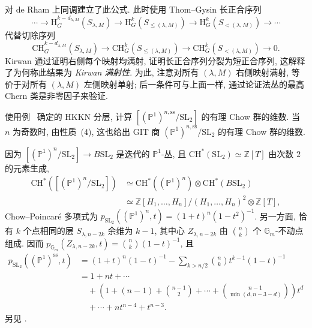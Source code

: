 \begin{remark}\label{src:8.7.15}
\cite[定理 5.4]{Kir84} 对 de Rham 上同调建立了此公式. 此时使用 Thom--Gysin 长正合序列
\[
\cdots\to\mathrm H_G^{k-d_{\lambda,M}}(S_{\lambda,M})\to\mathrm H_G^k(S_{\leq(\lambda,M)})\to\mathrm H_G^k(S_{<(\lambda,M)})\to\cdots
\]
代替切除序列
\[
\mathrm{CH}_G^{k-d_{\lambda,M}}(S_{\lambda,M})\to\mathrm{CH}_G^k(S_{\leq(\lambda,M)})\to\mathrm{CH}_G^k(S_{<(\lambda,M)})\to0.
\]
Kirwan 通过证明右侧每个映射均满射, 证明长正合序列分裂为短正合序列, 这解释了为何称此结果为 \textit{Kirwan 满射性}. 为此, 注意对所有 $(\lambda,M)$ 右侧映射满射, 等价于对所有 $(\lambda,M)$ 左侧映射单射; 后一条件可与上面一样, 通过论证法丛的最高 Chern 类是非零因子来验证.
\end{remark}
\begin{example}\label{src:8.7.16}
使用例~ 确定的 HKKN 分层, 计算 $[(\mathbb P^1)^{n,\mathrm{ss}}/\mathrm{SL}_2]$ 的有理 Chow 群的维数. 当 $n$ 为奇数时, 由性质~(4), 这也给出 GIT 商 $(\mathbb P^1)^{n,\mathrm{ss}}/\mathrm{SL}_2$ 的有理 Chow 群的维数.

因为 $[(\mathbb P^1)^n/\mathrm{SL}_2]\to B\mathrm{SL}_2$ 是迭代的 $\mathbb P^1$-丛, 且 $\mathrm{CH}^*(\mathrm{SL}_2)\simeq\mathbb Z[T]$ 由次数 $2$ 的元素生成,
\begin{align*}
\mathrm{CH}^*([(\mathbb P^1)^n/\mathrm{SL}_2])
&\simeq\mathrm{CH}^*((\mathbb P^1)^n)\otimes\mathrm{CH}^*(B\mathrm{SL}_2)\\
&\simeq\mathbb Z[H_1,\ldots,H_n]/(H_1,\ldots,H_n)^2\otimes\mathbb Z[T],
\end{align*}
Chow--Poincaré 多项式为 $p_{\mathrm{SL}_2}((\mathbb P^1)^n,t)=(1+t)^n(1-t^2)^{-1}$. 另一方面, 恰有 $k$ 个点相同的层 $S_{\lambda,n-2k}$ 余维为 $k-1$, 其中心 $Z_{\lambda,n-2k}$ 由 $\binom nk$ 个 $\mathbb G_m$-不动点组成. 因而 $p_{\mathbb G_m}(Z_{\lambda,n-2k},t)=\binom nk(1-t)^{-1}$, 且
\begin{align*}
p_{\mathrm{SL}_2}((\mathbb P^1)^{\mathrm{ss}},t)
&=(1+t)^n(1-t)^{-1}-\sum_{k>n/2}\binom nk t^{k-1}(1-t)^{-1}\\
&=1+nt+\cdots\\
&\quad+\left(1+(n-1)+\binom{n-1}2+\cdots+\binom{n-1}{\min(d,n-3-d)}\right)t^d\\
&\quad+\cdots+nt^{n-4}+t^{n-3}.
\end{align*}
另见 \cite[\S16.1]{Kir84}.
\end{example}
